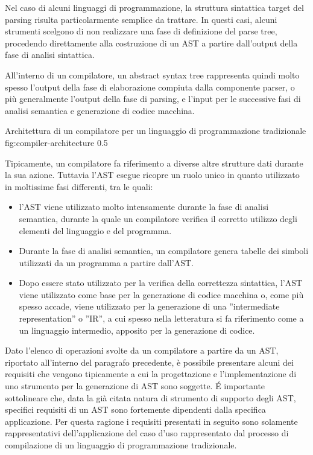 Nel caso di alcuni linguaggi di programmazione, la struttura sintattica target
del parsing risulta particolarmente semplice da trattare. In questi casi, alcuni
strumenti scelgono di non realizzare una fase di definizione del parse tree,
procedendo direttamente alla costruzione di un AST a partire dall’output della
fase di analisi sintattica.

All’interno di un compilatore, un abstract syntax tree rappresenta quindi molto
spesso l’output della fase di elaborazione compiuta dalla componente parser, o
più generalmente l’output della fase di parsing, e l’input per le successive
fasi di analisi semantica e generazione di codice macchina.

      {Architettura di un compilatore per un linguaggio di programmazione
      tradizionale}
      {fig:compiler-architecture}
      {0.5}

Tipicamente, un compilatore fa riferimento a diverse altre strutture dati
durante la sua azione. Tuttavia l’AST esegue ricopre un ruolo unico in quanto
utilizzato in moltissime fasi differenti, tra le quali:

\begin{itemize}

\item l'AST viene utilizzato molto intensamente durante la fase di analisi
semantica, durante la quale un compilatore verifica il corretto utilizzo degli
elementi del linguaggio e del programma.

\item Durante la fase di analisi semantica, un compilatore genera tabelle dei
simboli utilizzati da un programma a partire dall’AST.

\item Dopo essere stato utilizzato per la verifica della correttezza sintattica,
l’AST viene utilizzato come base per la generazione di codice macchina o, come
più spesso accade, viene utilizzato per la generazione di una ”intermediate
representation” o ”IR”, a cui spesso nella letteratura si fa riferimento come a
un linguaggio intermedio, apposito per la generazione di codice.

\end{itemize}

Dato l’elenco di operazioni svolte da un compilatore a partire da un AST,
riportato all’interno del paragrafo precedente, è possibile presentare alcuni
dei requisiti che vengono tipicamente a cui la progettazione e l’implementazione
di uno strumento per la generazione di AST sono soggette. É importante
sottolineare che, data la già citata natura di strumento di supporto degli AST,
specifici requisiti di un AST sono fortemente dipendenti dalla specifica
applicazione. Per questa ragione i requisiti presentati in seguito sono
solamente rappresentativi dell’applicazione del caso d'uso rappresentato dal
processo di compilazione di un linguaggio di programmazione tradizionale.

